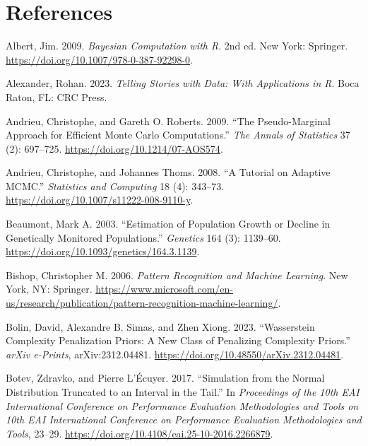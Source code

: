 \documentclass[
  11pt,
  letterpaper,
]{scrbook}
\newlength{\cslhangindent}
\newenvironment{CSLReferences}[2] %
 {\begin{list}{}{%
  \setlength{\itemindent}{0pt}
  \setlength{\leftmargin}{0pt}
  \setlength{\parsep}{0pt}
  \ifodd #1
   \setlength{\leftmargin}{\cslhangindent}
   \setlength{\itemindent}{-1\cslhangindent}
  \fi
  \setlength{\itemsep}{#2\baselineskip}}}
 {\end{list}}
\theoremstyle{plain}
\theoremstyle{plain}
\theoremstyle{definition}
\theoremstyle{definition}
\theoremstyle{definition}
\theoremstyle{plain}
\theoremstyle{remark}
\begin{document}

\chapter{References}\label{references}

\label{refs}
\begin{CSLReferences}{1}{0}
Albert, Jim. 2009. \emph{Bayesian Computation with {R}}. 2nd ed. New
York: Springer. \url{https://doi.org/10.1007/978-0-387-92298-0}.

Alexander, Rohan. 2023. \emph{Telling Stories with Data: With
Applications in {R}}. Boca Raton, FL: CRC Press.

Andrieu, Christophe, and Gareth O. Roberts. 2009. {``The Pseudo-Marginal
Approach for Efficient {M}onte {C}arlo Computations.''} \emph{The Annals
of Statistics} 37 (2): 697--725.
\url{https://doi.org/10.1214/07-AOS574}.

Andrieu, Christophe, and Johannes Thoms. 2008. {``A Tutorial on Adaptive
{MCMC}.''} \emph{Statistics and Computing} 18 (4): 343--73.
\url{https://doi.org/10.1007/s11222-008-9110-y}.

Beaumont, Mark A. 2003. {``Estimation of Population Growth or Decline in
Genetically Monitored Populations.''} \emph{Genetics} 164 (3): 1139--60.
\url{https://doi.org/10.1093/genetics/164.3.1139}.

Bishop, Christopher M. 2006. \emph{Pattern Recognition and Machine
Learning}. New York, NY: Springer.
\url{https://www.microsoft.com/en-us/research/publication/pattern-recognition-machine-learning/}.

Bolin, David, Alexandre B. Simas, and Zhen Xiong. 2023. {``{W}asserstein
Complexity Penalization Priors: A New Class of Penalizing Complexity
Priors.''} \emph{arXiv e-Prints}, arXiv:2312.04481.
\url{https://doi.org/10.48550/arXiv.2312.04481}.

Botev, Zdravko, and Pierre L'Écuyer. 2017. {``Simulation from the Normal
Distribution Truncated to an Interval in the Tail.''} In
\emph{Proceedings of the 10th EAI International Conference on
Performance Evaluation Methodologies and Tools on 10th EAI International
Conference on Performance Evaluation Methodologies and Tools}, 23--29.
\url{https://doi.org/10.4108/eai.25-10-2016.2266879}.


\end{CSLReferences}
\end{document}
